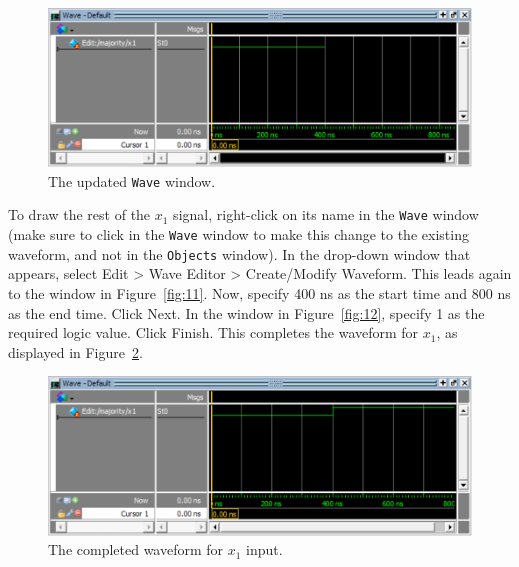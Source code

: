 \documentclass[11pt, twoside, pdftex]{article}
\begin{document}
\begin{figure}[H]
   \begin{center}
      \includegraphics[scale=1.0]{figures/figure13.png}
       \caption{The updated \texttt{Wave} window.} 
	 \label{fig:13}
	 \end{center}
\end{figure}

To draw the rest of the $x_1$ signal, right-click on its name in the \texttt{Wave} window (make
sure to click in the \texttt{Wave} window to make this 
change to the existing waveform, and not in the \texttt{Objects} window).
In the drop-down window that appears, select {\sf Edit > Wave Editor > Create/Modify Waveform}.
This leads again to the window in Figure~\ref{fig:11}. Now, specify 400 ns as the start time
and 800 ns as the end time. Click {\sf Next}. In the window in Figure~\ref{fig:12}, specify
1 as the required logic value. Click {\sf Finish}. This completes the waveform for $x_1$,
as displayed in Figure~\ref{fig:14}.


\begin{figure}[H]
   \begin{center}
      \includegraphics[scale=1.0]{figures/figure14.png}
   \caption{The completed waveform for $x_1$ input.} 
	 \label{fig:14}
	 \end{center}
\end{figure}
\end{document}
